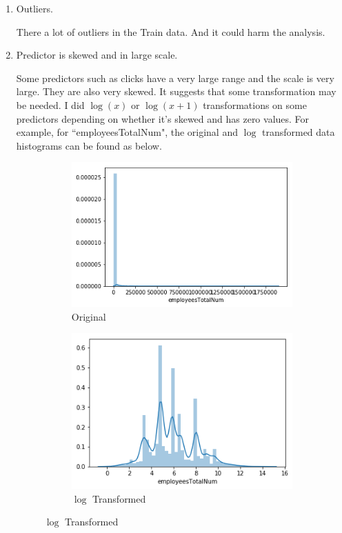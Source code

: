 \documentclass[12pt]{report}
\begin{document}
\begin{enumerate}
\begin{enumerate}
	\item Outliers.
	
	There a lot of outliers in the Train data. And it could harm the analysis.
	
	\item Predictor is skewed and in large scale.
	
	Some predictors such as clicks have a very large range and the scale is very large. They are also very skewed. It suggests that some transformation may be needed. I did $\log(x)$ or $\log(x+1)$ transformations on some predictors depending on whether it's skewed and has zero values. For example, for ``employeesTotalNum", the original and $\log$ transformed data histograms can be found as below.
	\begin{figure}[h!]
		\begin{subfigure}[h]{0.41\linewidth}
			\includegraphics[width=\linewidth]{skew.png}
			\caption{Original}
		\end{subfigure}
		\hfill
		\begin{subfigure}[h]{0.4\linewidth}
			\includegraphics[width=\linewidth]{transform.png}
			\caption{$\log$ Transformed}
		\end{subfigure}%
	\end{figure}
		

\end{enumerate}
\end{enumerate}
\end{document}
